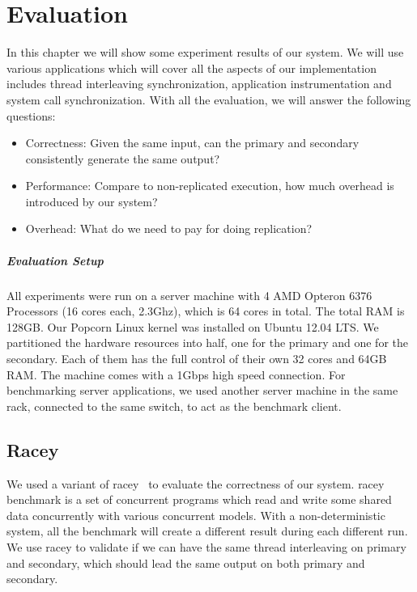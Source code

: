 \chapter{Evaluation}

In this chapter we will show some experiment results of our system. We will use various applications which will cover all the aspects of our implementation includes thread interleaving synchronization, application instrumentation and system call synchronization. With all the evaluation, we will answer the following questions:

\begin{itemize}
  \item Correctness: Given the same input, can the primary and secondary consistently generate the same output?
  \item Performance: Compare to non-replicated execution, how much overhead is introduced by our system?
  \item Overhead: What do we need to pay for doing replication?
\end{itemize}

\paragraph{Evaluation Setup} All experiments were run on a server machine with 4 AMD Opteron 6376 Processors (16 cores each, 2.3Ghz), which is 64 cores in total. The total RAM is 128GB. Our Popcorn Linux kernel was installed on Ubuntu 12.04 LTS. We partitioned the hardware resources into half, one for the primary and one for the secondary. Each of them has the full control of their own 32 cores and 64GB RAM. The machine comes with a 1Gbps high speed connection. For benchmarking server applications, we used another server machine in the same rack, connected to the same switch, to act as the benchmark client.

\section{Racey}
We used a variant of racey~\cite{hillstress} to evaluate the correctness of our system. racey benchmark is a set of concurrent programs which read and write some shared data concurrently with various concurrent models. With a non-deterministic system, all the benchmark will create a different result during each different run. We use racey to validate if we can have the same thread interleaving on primary and secondary, which should lead the same output on both primary and secondary.

